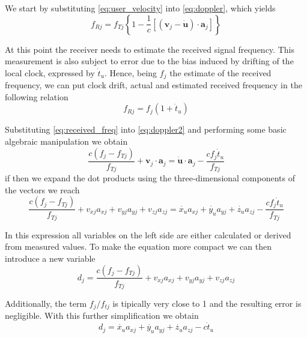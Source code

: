 We start by substituting \ref{eq:user_velocity} into \ref{eq:doppler}, which
yields
\begin{equation} \label{eq:doppler2}
  f_{Rj} = f_{Tj}\left\{ 1-\frac{1}{c}\left[ \left( \bm{v}_j - \bm{\dot u} \right) \cdot \bm{a}_j \right] \right\} 
\end{equation} 

At this point the receiver needs to estimate the received signal frequency. This
measurement is also subject to error due to the bias induced by drifting of the
local clock, expressed by $\dot t_u$. Hence, being $f_j$ the estimate of the
received frequency, we can put clock drift, actual and estimated received
frequency in the following relation
\begin{equation} \label{eq:received_freq}
  f_{Rj} = f_j (1 + \dot t_u)
\end{equation}

Substituting \ref{eq:received_freq} into \ref{eq:doppler2} and performing some
basic algebraic manipulation we obtain
\begin{equation}
  \frac{c(f_j - f_{Tj})}{f_{Tj}}+\bm{v}_j \cdot \bm{a}_j = \bm{\dot u} \cdot \bm{a}_j - \frac{c f_j \dot t_u}{f_{Tj}}
\end{equation}
if then we expand the dot products using the three-dimensional components of the
vectors we reach
\begin{equation}
  \frac{c(f_j - f_{Tj})}{f_{Tj}} + v_{xj}a_{xj} + v_{yj}a_{yj} + v_{zj}a_{zj} =
  \dot{x_u} a_{xj} + \dot{y_u} a_{yj} + \dot{z_u} a_{zj} - \frac{c f_j \dot t_u}{f_{Tj}}
\end{equation}

In this expression all variables on the left side are either calculated or
derived from measured values. To make the equation more compact we can then
introduce a new variable
\begin{equation}
  d_j = \frac{c(f_j - f_{Tj})}{f_{Tj}} + v_{xj}a_{xj} + v_{yj}a_{yj} + v_{zj}a_{zj}
\end{equation}

Additionally, the term $f_j/f_{tj}$ is tipically very close to 1 and the
resulting error is negligible. With this further simplification we obtain
\begin{equation}
  d_j = \dot{x_u} a_{xj} + \dot{y_u} a_{yj} + \dot{z_u} a_{zj} - c \dot t_u
\end{equation}

